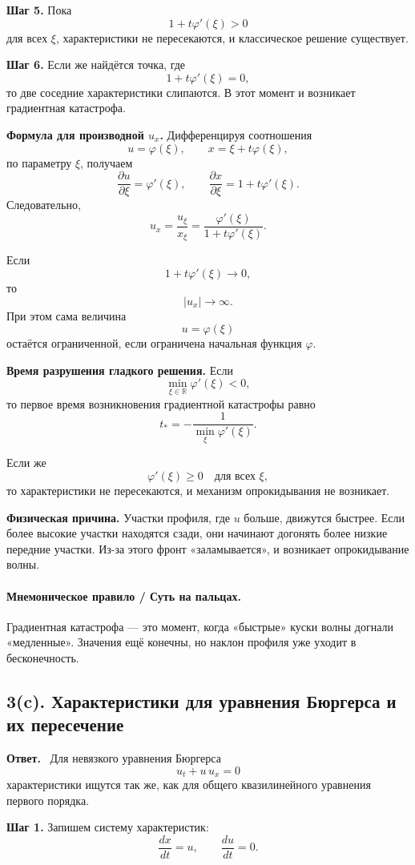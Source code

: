 \documentclass[a4paper,12pt]{article}
\newcommand{\R}{\mathbb{R}}
\newcommand{\Answer}{\textbf{Ответ.}\ }
\begin{document}
\textbf{Шаг 5.} Пока
\[
1+t\varphi'(\xi)>0
\]
для всех $\xi$, характеристики не пересекаются, и классическое решение существует.

\textbf{Шаг 6.} Если же найдётся точка, где
\[
1+t\varphi'(\xi)=0,
\]
то две соседние характеристики слипаются. В этот момент и возникает градиентная катастрофа.

\textbf{Формула для производной $u_x$.}
Дифференцируя соотношения
\[
u=\varphi(\xi),
\qquad
x=\xi+t\varphi(\xi),
\]
по параметру $\xi$, получаем
\[
\frac{\partial u}{\partial \xi}=\varphi'(\xi),
\qquad
\frac{\partial x}{\partial \xi}=1+t\varphi'(\xi).
\]
Следовательно,
\[
u_x=\frac{u_\xi}{x_\xi}
=
\frac{\varphi'(\xi)}{1+t\varphi'(\xi)}.
\]

Если
\[
1+t\varphi'(\xi)\to 0,
\]
то
\[
|u_x|\to\infty.
\]
При этом сама величина
\[
u=\varphi(\xi)
\]
остаётся ограниченной, если ограничена начальная функция $\varphi$.

\textbf{Время разрушения гладкого решения.}
Если
\[
\min_{\xi\in\R}\varphi'(\xi)<0,
\]
то первое время возникновения градиентной катастрофы равно
\[
t_*=
-\frac{1}{\min\limits_{\xi}\varphi'(\xi)}.
\]

Если же
\[
\varphi'(\xi)\ge 0
\quad \text{для всех } \xi,
\]
то характеристики не пересекаются, и механизм опрокидывания не возникает.

\textbf{Физическая причина.}
Участки профиля, где $u$ больше, движутся быстрее. Если более высокие участки находятся сзади, они начинают догонять более низкие передние участки. Из-за этого фронт «заламывается», и возникает опрокидывание волны.

\paragraph{Мнемоническое правило / Суть на пальцах.}
Градиентная катастрофа --- это момент, когда «быстрые» куски волны догнали «медленные». Значения ещё конечны, но наклон профиля уже уходит в бесконечность.

\subsection*{3(c). Характеристики для уравнения Бюргерса и их пересечение}

\Answer
Для невязкого уравнения Бюргерса
\[
u_t+u\,u_x=0
\]
характеристики ищутся так же, как для общего квазилинейного уравнения первого порядка.

\textbf{Шаг 1.} Запишем систему характеристик:
\[
\frac{dx}{dt}=u,
\qquad
\frac{du}{dt}=0.
\]
\end{document}
